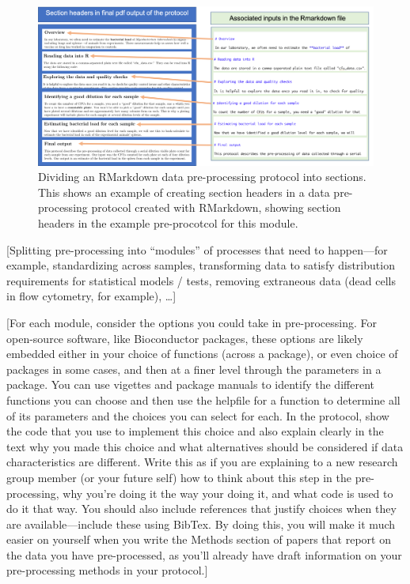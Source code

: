 \documentclass[]{tufte-book}
\begin{document}
\begin{figure}
\includegraphics[width=\textwidth]{figures/protocol_sections} \caption[Dividing an RMarkdown data pre-processing protocol into sections]{Dividing an RMarkdown data pre-processing protocol into sections. This shows an example of creating section headers in a data pre-processing protocol created with RMarkdown, showing section headers in the example pre-procotcol for this module.}\label{fig:protocolsections}
\end{figure}

{[}Splitting pre-processing into ``modules'' of processes that need to happen---for
example, standardizing across samples, transforming data to satisfy distribution
requirements for statistical models / tests, removing extraneous data (dead
cells in flow cytometry, for example), \ldots{]}

{[}For each module, consider the options you could take in pre-processing. For
open-source software, like Bioconductor packages, these options are likely
embedded either in your choice of functions (across a package), or even choice
of packages in some cases, and then at a finer level through the parameters in a
package. You can use vigettes and package manuals to identify the different
functions you can choose and then use the helpfile for a function to determine
all of its parameters and the choices you can select for each. In the protocol,
show the code that you use to implement this choice and also explain clearly in
the text why you made this choice and what alternatives should be considered if
data characteristics are different. Write this as if you are explaining to a new
research group member (or your future self) how to think about this step in the
pre-processing, why you're doing it the way your doing it, and what code is used
to do it that way. You should also include references that justify choices when
they are available---include these using BibTex. By doing this, you will make it
much easier on yourself when you write the Methods section of papers that report
on the data you have pre-processed, as you'll already have draft information on
your pre-processing methods in your protocol.{]}
\end{document}
